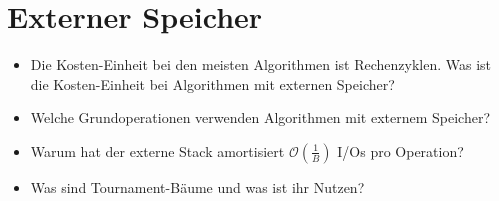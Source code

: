 \documentclass[a4paper,12pt]{article}
\begin{document}
\section{Externer Speicher}
\begin{itemize}
    \item Die Kosten-Einheit bei den meisten Algorithmen ist Rechenzyklen.
          Was ist die Kosten-Einheit bei Algorithmen mit externen Speicher?
    \item Welche Grundoperationen verwenden Algorithmen mit 
          externem Speicher?
    \item Warum hat der externe Stack amortisiert 
          $\mathcal{O}(\frac{1}{B})$ I/Os pro Operation?
    \item Was sind Tournament-Bäume und was ist ihr Nutzen?
\end{itemize}
\clearpage
\end{document}
